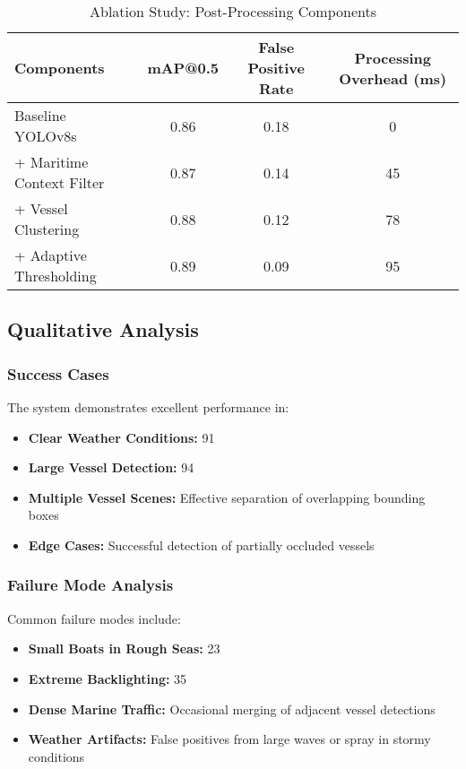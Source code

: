 \documentclass[a4paper,11pt]{article}
\begin{document}
\begin{table}[H]
\centering
\caption{Ablation Study: Post-Processing Components}
\label{tab:postprocessing_ablation}
\begin{tabular}{@{}lccc@{}}
\toprule
Components & mAP@0.5 & False Positive Rate & Processing Overhead (ms) \\
\midrule
Baseline YOLOv8s & 0.86 & 0.18 & 0 \\
+ Maritime Context Filter & 0.87 & 0.14 & 45 \\
+ Vessel Clustering & 0.88 & 0.12 & 78 \\
+ Adaptive Thresholding & 0.89 & 0.09 & 95 \\
\bottomrule
\end{tabular}
\end{table}

\subsection{Qualitative Analysis}

\subsubsection{Success Cases}
The system demonstrates excellent performance in:
\begin{itemize}
    \item \textbf{Clear Weather Conditions:} 91%
    \item \textbf{Large Vessel Detection:} 94%
    \item \textbf{Multiple Vessel Scenes:} Effective separation of overlapping bounding boxes
    \item \textbf{Edge Cases:} Successful detection of partially occluded vessels
\end{itemize}

\subsubsection{Failure Mode Analysis}
Common failure modes include:
\begin{itemize}
    \item \textbf{Small Boats in Rough Seas:} 23%
    \item \textbf{Extreme Backlighting:} 35%
    \item \textbf{Dense Marine Traffic:} Occasional merging of adjacent vessel detections
    \item \textbf{Weather Artifacts:} False positives from large waves or spray in stormy conditions
\end{itemize}
\end{document}
